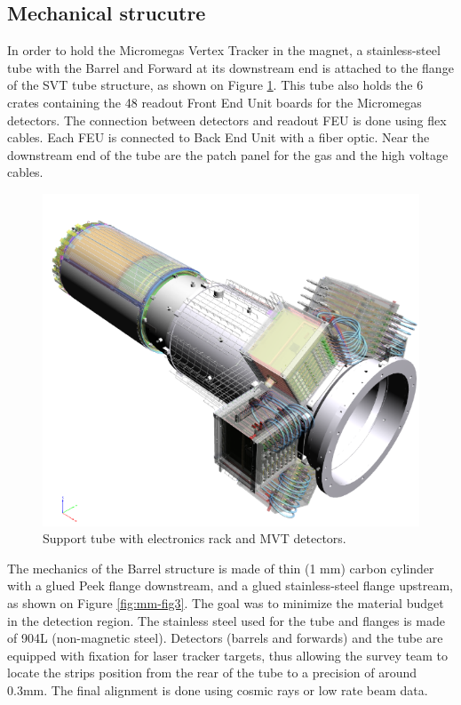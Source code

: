 \subsection{Mechanical strucutre}
In order to hold the Micromegas Vertex Tracker in the magnet, a stainless-steel tube with the Barrel and Forward at its downstream end is attached to the flange of the SVT tube structure, as shown on Figure \ref{fig:mm-fig2}. This tube also holds the 6 crates containing the 48 readout Front End Unit boards for the Micromegas detectors. The connection between detectors and readout FEU is done using flex cables. Each FEU is connected to Back End Unit with a fiber optic. Near the downstream end of the tube are the patch panel for the gas and the high voltage cables.

\begin{figure}[htb]
 \includegraphics[width=1.0\columnwidth,keepaspectratio]{images/fig2}
 \caption{Support tube with electronics rack and MVT detectors.}
 \label{fig:mm-fig2}
\end{figure}

The mechanics of the Barrel structure is made of thin (1 mm) carbon cylinder with a glued Peek flange downstream, and a glued stainless-steel flange upstream, as shown on Figure \ref{fig:mm-fig3}. The goal was to minimize the material budget in the detection region. The stainless steel used for the tube and flanges is made of 904L (non-magnetic steel). Detectors (barrels and forwards) and the tube are equipped with fixation for laser tracker targets, thus allowing the survey team to locate the strips position from the rear of the tube to a precision of around 0.3mm. The final alignment is done using cosmic rays or low rate beam data. 

